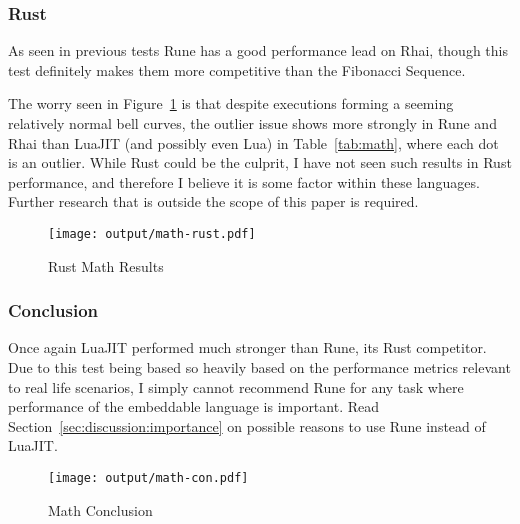 \subsubsection{Rust}
As seen in previous tests Rune has a good performance lead on Rhai, though this test definitely makes them more competitive than the Fibonacci Sequence.

The worry seen in Figure~\ref{fig:math-rust} is that despite executions forming a seeming relatively normal bell curves, the outlier issue shows more strongly in Rune and Rhai than LuaJIT (and possibly even Lua) in Table~\ref{tab:math}, where each dot is an outlier. While Rust could be the culprit, I have not seen such results in Rust performance, and therefore I believe it is some factor within these languages. Further research that is outside the scope of this paper is required.

\begin{figure}[H]
	\centering
		\texttt{[image: output/math-rust.pdf]}
	\caption{Rust Math Results}
	\label{fig:math-rust}
\end{figure}

\subsubsection{Conclusion}
Once again LuaJIT performed much stronger than Rune, its Rust competitor. Due to this test being based so heavily based on the performance metrics relevant to real life scenarios, I simply cannot recommend Rune for any task where performance of the embeddable language is important. Read Section~\ref{sec:discussion:importance} on possible reasons to use Rune instead of LuaJIT.

\begin{figure}[H]
	\centering
		\texttt{[image: output/math-con.pdf]}
	\caption{Math Conclusion}
	\label{fig:math-con}
\end{figure}
